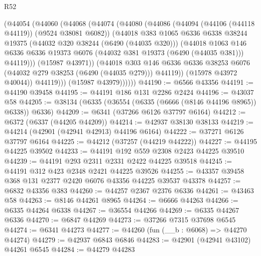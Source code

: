 \begin{lexlean}{R52}
\begin{coremodule}
                (@44054
                  (@44060
                    (@44068
                      (@44074
                        (@44080
                          (@44086
                            (@44094 (@44106 (@44118 @44119)) (@9524 @38081 @6082))
                            (@44018
                              @383
                              @1065
                              @6336
                              @6338
                              @38244
                              @19375
                              (@44032 @320 @38244 (@6490 (@44035 @320)))
                              (@44018
                                @1063
                                @146
                                @6336
                                @6336
                                @19373
                                @6076
                                (@44032 @381 @19373 (@6490 (@44035 @381)))
                                @44119)))
                          (@15987 @43971))
                        (@44018
                          @303
                          @146
                          @6336
                          @6336
                          @38253
                          @6076
                          (@44032 @279 @38253 (@6490 (@44035 @279)))
                          @44119))
                      (@15978 @43972 @40044))
                    @44119)))
              (@15987 @43979))))))
@44190 := @6566 @43356
@44191 := @44190 @39458
@44195 := @44191 @186 @131 @2286 @2424
@44196 := @43037 @58
@44205 := @38134 (@6335 (@36554 (@6335 (@6666 (@8146 @44196 @8965)) @6338)) @6336)
@44209 := @6341 (@37266 @6126 @37797 @6164)
@44212 := @6372 (@6337 (@44205 @44209))
@44214 := @42937 @38130 @38133
@44219 := @44214 (@42901 (@42941 @42913) @44196 @6164)
@44222 := @37271 @6126 @37797 @6164
@44225 := @44212 (@37257 (@44219 @44222))
@44227 := @44195 @44225 @39502
@44233 := @44191 @192 @559 @2308 @2423 @44225 @39510
@44239 := @44191 @293 @2311 @2331 @2422 @44225 @39518
@44245 := @44191 @312 @423 @2348 @2421 @44225 @39526
@44255 := @43357 @39458 @368 @131 @2377 @2420 @6076 @43356 @44225 @39537 @43378
@44257 := @6832 @43356 @383
@44260 := @44257 @2367 @2376 @6336
@44261 := @43463 @58
@44263 := @8146 @44261 @8965
@44264 := @6666 @44263
@44266 := @6335 @44264 @6338
@44267 := @36554 @44266
@44269 := @6335 @44267 @6336
@44270 := @6847 @44269
@44273 := @37266 @7315 @37698 @6545
@44274 := @6341 @44273
@44277 := @44260 (fun (__b : @6068) => @44270 @44274)
@44279 := @42937 @6843 @6846
@44283 := @42901 (@42941 @43102) @44261 @6545
@44284 := @44279 @44283

\end{coremodule}
\end{lexlean}
